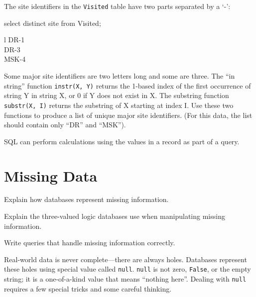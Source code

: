 \begin{challenge}
  The site identifiers in the \texttt{Visited} table have two parts
  separated by a `-':

\begin{VerbIn}
select distinct site from Visited;
\end{VerbIn}

\begin{sqltable}{l}
DR-1 \\
DR-3 \\
MSK-4 \\
\end{sqltable}

Some major site identifiers are two letters long and some are three. The
``in string'' function \texttt{instr(X, Y)} returns the 1-based index of
the first occurrence of string Y in string X, or 0 if Y does not exist
in X. The substring function \texttt{substr(X, I)} returns the substring
of X starting at index I. Use these two functions to produce a list of
unique major site identifiers. (For this data, the list should contain
only ``DR'' and ``MSK'').
\end{challenge}

\begin{keypoints}
\begin{swcitemize}
\item
  SQL can perform calculations using the values in a record as part of a
  query.
\end{swcitemize}
\end{keypoints}

\section{Missing Data}

\begin{objectives}
\begin{swcitemize}
\item
  Explain how databases represent missing information.
\item
  Explain the three-valued logic databases use when manipulating missing
  information.
\item
  Write queries that handle missing information correctly.
\end{swcitemize}
\end{objectives}

Real-world data is never complete---there are always holes. Databases
represent these holes using special value called \texttt{null}.
\texttt{null} is not zero, \texttt{False}, or the empty string; it is a
one-of-a-kind value that means ``nothing here''. Dealing with
\texttt{null} requires a few special tricks and some careful thinking.

